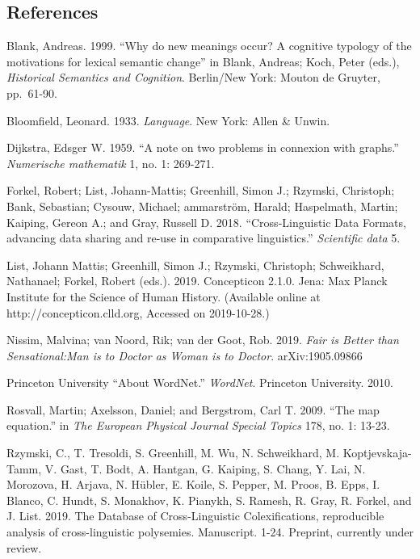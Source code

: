 \documentclass[
  a4paper,
  14pt,
  oneside,
  tablecaptionabove
]{scrbook}
\begin{document}
\subsection*{References}

\nopagebreak\hangindent=0.7cm {\small  Blank, Andreas. 1999. \enquote{Why do new meanings occur? A
cognitive typology of the motivations for lexical semantic change} in
Blank, Andreas; Koch, Peter (eds.), \emph{Historical Semantics and
Cognition}. Berlin/New York: Mouton de Gruyter, pp.~61-90. }

\nopagebreak\hangindent=0.7cm {\small  Bloomfield, Leonard. 1933. \emph{Language}. New York: Allen \&
Unwin.}

\nopagebreak\hangindent=0.7cm {\small  Dijkstra, Edsger W. 1959. \enquote{A note on two problems in
connexion with graphs.} \emph{Numerische mathematik} 1, no. 1:
269-271.}

\nopagebreak\hangindent=0.7cm {\small  Forkel, Robert; List, Johann-Mattis; Greenhill, Simon J.; Rzymski,
Christoph; Bank, Sebastian; Cysouw, Michael; ammarström, Harald;
Haspelmath, Martin; Kaiping, Gereon A.; and Gray, Russell D. 2018.
\enquote{Cross-Linguistic Data Formats, advancing data sharing and
re-use in comparative linguistics.} \emph{Scientific data} 5.}

\nopagebreak\hangindent=0.7cm {\small  List, Johann Mattis; Greenhill, Simon J.; Rzymski, Christoph;
Schweikhard, Nathanael; Forkel, Robert (eds.). 2019. Concepticon 2.1.0.
Jena: Max Planck Institute for the Science of Human History. (Available
online at http://concepticon.clld.org, Accessed on 2019-10-28.)}

\nopagebreak\hangindent=0.7cm {\small  Nissim, Malvina; van Noord, Rik; van der Goot, Rob. 2019. \emph{Fair
is Better than Sensational:Man is to Doctor as Woman is to Doctor}.
arXiv:1905.09866 }

\nopagebreak\hangindent=0.7cm {\small  Princeton University \enquote{About WordNet.} \emph{WordNet}.
Princeton University. 2010. }

\nopagebreak\hangindent=0.7cm {\small  Rosvall, Martin; Axelsson, Daniel; and Bergstrom, Carl T. 2009.
\enquote{The map equation.} in \emph{The European Physical Journal
Special Topics} 178, no. 1: 13-23. }

\nopagebreak\hangindent=0.7cm {\small  Rzymski, C., T. Tresoldi, S. Greenhill, M. Wu, N. Schweikhard, M.
Koptjevskaja-Tamm, V. Gast, T. Bodt, A. Hantgan, G. Kaiping, S. Chang,
Y. Lai, N. Morozova, H. Arjava, N. Hübler, E. Koile, S. Pepper, M.
Proos, B. Epps, I. Blanco, C. Hundt, S. Monakhov, K. Pianykh, S. Ramesh,
R. Gray, R. Forkel, and J. List. 2019. The Database of Cross-Linguistic
Colexifications, reproducible analysis of cross-linguistic polysemies.
Manuscript. 1-24. Preprint, currently under review.}
\end{document}
